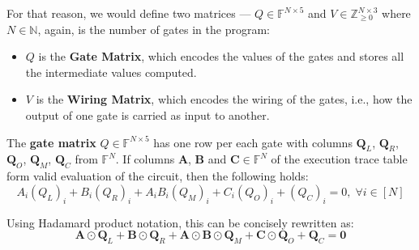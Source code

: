 \documentclass[../lecture-notes-148x210.tex]{subfiles}
\begin{document}
For that reason, we would define two matrices --- $Q \in \mathbb{F}^{N \times
5}$ and $V \in \mathbb{Z}_{\geq 0}^{N \times 3}$ where $N \in \mathbb{N}$, again, is the number of gates in the
program:
\begin{itemize}
    \item $Q$ is the \textbf{Gate Matrix}, which encodes the values of the gates and stores all the intermediate values computed.
    \item $V$ is the \textbf{Wiring Matrix}, which encodes the wiring of the gates, i.e., how the output of one gate is carried as input to another.
\end{itemize}

\begin{definition}
The \textbf{gate matrix} $Q \in \mathbb{F}^{N \times 5}$ has one row per each gate with columns $\mathbf{Q}_L$,
$\mathbf{Q}_R$, $\mathbf{Q}_O$, $\mathbf{Q}_M$, $\mathbf{Q}_C$ from
$\mathbb{F}^N$. If columns $\mathbf{A}$, $\mathbf{B}$ and $\mathbf{C} \in
\mathbb{F}^N$ of the execution trace table form valid evaluation of the circuit, 
then the following holds:
\begin{equation*}
    A_i (Q_{L})_i + B_i (Q_{R})_i + A_i B_i (Q_{M})_i + C_i (Q_{O})_i + (Q_{C})_i = 0, \; \forall i \in [N]    
\end{equation*}

Using Hadamard product notation, this can be concisely rewritten as:
\begin{equation*}
    \mathbf{A} \odot \mathbf{Q}_L + \mathbf{B} \odot \mathbf{Q}_R + \mathbf{A} \odot \mathbf{B} \odot \mathbf{Q}_M + \mathbf{C} \odot \mathbf{Q}_O + \mathbf{Q}_C = \mathbf{0}
\end{equation*}

\end{definition}
\end{document}
